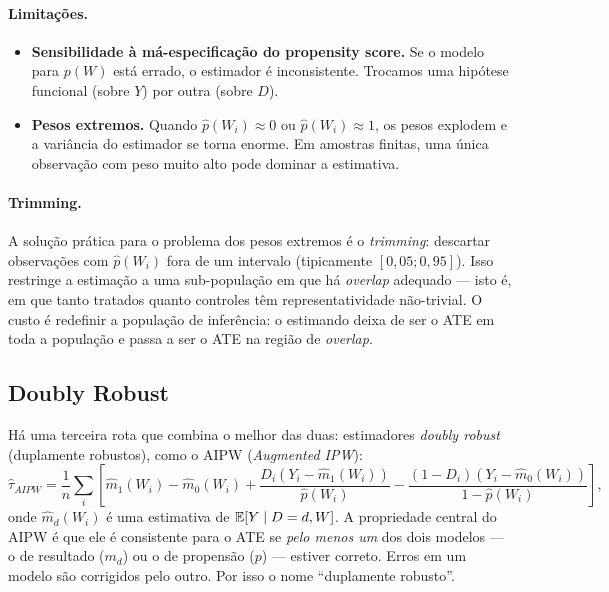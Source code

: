 \paragraph{Limitações.}
\begin{itemize}
  \item \textbf{Sensibilidade à má-especificação do propensity score.} Se o modelo para $p(W)$ está errado, o estimador é inconsistente. Trocamos uma hipótese funcional (sobre $Y$) por outra (sobre $D$).
  \item \textbf{Pesos extremos.} Quando $\hat{p}(W_i) \approx 0$ ou $\hat{p}(W_i) \approx 1$, os pesos explodem e a variância do estimador se torna enorme. Em amostras finitas, uma única observação com peso muito alto pode dominar a estimativa.
\end{itemize}

\paragraph{Trimming.} A solução prática para o problema dos pesos extremos é o \textit{trimming}: descartar observações com $\hat{p}(W_i)$ fora de um intervalo (tipicamente $[0{,}05; 0{,}95]$). Isso restringe a estimação a uma sub-população em que há \textit{overlap} adequado --- isto é, em que tanto tratados quanto controles têm representatividade não-trivial. O custo é redefinir a população de inferência: o estimando deixa de ser o ATE em toda a população e passa a ser o ATE na região de \textit{overlap}.

\subsection*{Doubly Robust}

Há uma terceira rota que combina o melhor das duas: estimadores \textit{doubly robust} (duplamente robustos), como o AIPW (\textit{Augmented IPW}):
\begin{equation}
\hat{\tau}_{AIPW} = \frac{1}{n} \sum_i \!\left[ \hat{m}_1(W_i) - \hat{m}_0(W_i) + \frac{D_i (Y_i - \hat{m}_1(W_i))}{\hat{p}(W_i)} - \frac{(1 - D_i)(Y_i - \hat{m}_0(W_i))}{1 - \hat{p}(W_i)} \right],
\label{eq:aipw}
\end{equation}
onde $\hat{m}_d(W_i)$ é uma estimativa de $\mathbb{E}[Y \mid D = d, W]$. A propriedade central do AIPW é que ele é consistente para o ATE se \textit{pelo menos um} dos dois modelos --- o de resultado ($m_d$) ou o de propensão ($p$) --- estiver correto. Erros em um modelo são corrigidos pelo outro. Por isso o nome ``duplamente robusto''.

